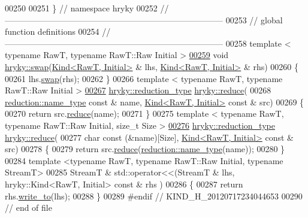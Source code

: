 \begin{DoxyCode}
00250 
00251 \} \textcolor{comment}{// namespace hryky}
00252 \textcolor{comment}{//
      ------------------------------------------------------------------------------}
00253 \textcolor{comment}{// global function definitions}
00254 \textcolor{comment}{//
      ------------------------------------------------------------------------------}
00258 \textcolor{comment}{}\textcolor{keyword}{template} < \textcolor{keyword}{typename} RawT, \textcolor{keyword}{typename} RawT::Raw Initial >
\hypertarget{kind_8h_source_l00259}{}\hyperlink{namespacehryky_a38b65dba4a76741a904282b0e41424e5}{00259} \textcolor{keywordtype}{void} \hyperlink{namespacehryky_a4282146df5ea2b68cb667896a2205909}{hryky::swap}(\hyperlink{classhryky_1_1_kind}{Kind<RawT, Initial>} & lhs, \hyperlink{classhryky_1_1_kind}{Kind<RawT, Initial>} & rhs)
00260 \{
00261     lhs.\hyperlink{classhryky_1_1_kind_a3d9362db97d8529581597a8068d43cfb}{swap}(rhs);
00262 \}
00266 \textcolor{keyword}{template} < \textcolor{keyword}{typename} RawT, \textcolor{keyword}{typename} RawT::Raw Initial >
\hypertarget{kind_8h_source_l00267}{}\hyperlink{namespacehryky_aa5bb140e64818a1ebfe12965b9a1e0a3}{00267} \hyperlink{classhryky_1_1_intrusive_ptr}{hryky::reduction_type} \hyperlink{namespacehryky_af41cb3af6766761da0ff21b84527a52c}{hryky::reduce}(
00268     \hyperlink{classhryky_1_1reduction_1_1_string}{reduction::name_type} \textcolor{keyword}{const} & name, \hyperlink{classhryky_1_1_kind}{Kind<RawT, Initial>} \textcolor{keyword}{const} & src)
00269 \{
00270     \textcolor{keywordflow}{return} src.\hyperlink{classhryky_1_1_kind_ab11ab99ebf2c6d081648de78e8d7241f}{reduce}(name);
00271 \}
00275 \textcolor{keyword}{template} < \textcolor{keyword}{typename} RawT, \textcolor{keyword}{typename} RawT::Raw Initial, \textcolor{keywordtype}{size\_t} Size >
\hypertarget{kind_8h_source_l00276}{}\hyperlink{namespacehryky_ae0562462283099b0d51a02a4012ccc56}{00276} \hyperlink{classhryky_1_1_intrusive_ptr}{hryky::reduction_type} \hyperlink{namespacehryky_af41cb3af6766761da0ff21b84527a52c}{hryky::reduce}(
00277     \textcolor{keywordtype}{char} \textcolor{keyword}{const} (&name)[Size], \hyperlink{classhryky_1_1_kind}{Kind<RawT, Initial>} \textcolor{keyword}{const} & src)
00278 \{
00279     \textcolor{keywordflow}{return} src.\hyperlink{classhryky_1_1_kind_ab11ab99ebf2c6d081648de78e8d7241f}{reduce}(\hyperlink{classhryky_1_1reduction_1_1_string}{reduction::name_type}(name));
00280 \}
00284 \textcolor{keyword}{template} <\textcolor{keyword}{typename} RawT, \textcolor{keyword}{typename} RawT::Raw Initial, \textcolor{keyword}{typename} StreamT>
00285 StreamT & std::operator<<(StreamT & lhs, hryky::Kind<RawT, Initial> \textcolor{keyword}{const} & rhs
      )
00286 \{
00287     \textcolor{keywordflow}{return} rhs.\hyperlink{classhryky_1_1_kind_a1c070e6cf60cc110690142667089c3ff}{write_to}(lhs);
00288 \}
00289 \textcolor{preprocessor}{#endif // KIND\_H\_20120717234044653}
00290 \textcolor{preprocessor}{}\textcolor{comment}{// end of file}
\end{DoxyCode}
